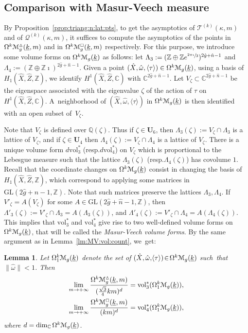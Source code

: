 \documentclass[11pt]{article}
\newcommand{\resp}{resp.\xspace}
\numberwithin{equation}{section}
\let\mathcal\EuScript
\theoremstyle{plain}
\newtheorem{Lemma}[Theorem]{Lemma}
\theoremstyle{definition}
\def\C{\mathbb{C}}
\newcommand\Z{\mathbb{Z}}
\newcommand{\Q}{\mathbb{Q}}
\newcommand{\Ub}{\mathbf{U}}
\newcommand{\Mcal}{\mathcal{M}}
\newcommand{\QQ}{\mathscr{Q}}
\newcommand{\TT}{\mathscr{T}}
\newcommand{\GL}{\mathrm{GL}}
\newcommand{\vol}{\mathrm{vol}}
\newcommand{\hg}{\hat{g}}
\newcommand{\hn}{\hat{n}}
\newcommand{\hX}{\hat{X}}
\newcommand{\hZ}{\hat{Z}}
\newcommand{\homg}{\hat{\omega}}
\let\ul\underline
\newcommand{\Skdiff}{\Omega^k\mathcal{M}_{g}(\ul{k})}
\newcommand{\Skdiffi}{\Omega^k_1\mathcal{M}_{g}(\ul{k})}
\newcommand{\Tkdiffm}{\Omega^k\Mcal^\vartriangle_g(\ul{k},m)}
\newcommand{\Qkdiffm}{\Omega^k\Mcal^{\scriptscriptstyle\square}_g(\ul{k},m)}
\begin{document}
\subsection{Comparison with Masur-Veech measure}\label{sec:compare:MV:vol}
By Proposition~\ref{prop:triang:n:lat:pts}, to get the asymptotics of $\TT^{(k)}(\kappa,m)$ and of $\QQ^{(k)}(\kappa,m)$, it suffices to compute the asymptotics of the points in $\Tkdiffm$ and in $\Qkdiffm$ respectively. For this purpose, we introduce some volume forms on $\Skdiff$ as follows: let $\Lambda_3:=(\Z\oplus\Z e^{\sfrac{2\pi\imath}{3}})^{2\hg+\hn-1}$ and $\Lambda_4:=(\Z\oplus\Z\imath)^{2\hg+\hn-1}$.
Given a point $(\hX,\homg,\langle\tau\rangle) \in \Skdiff$, using a basis of $H_1(\hX,\hZ,\Z)$, we identify $H^1(\hX,\hZ,\C)$ with $\C^{2\hg+\hn-1}$.
Let $V_\zeta \subset \C^{2\hg+\hn-1}$ be the eigenspace associated with the eigenvalue $\zeta$ of the action of $\tau$ on $H^1(\hX,\hZ,\C)$.
A~neighborhood of $(\hX,\homg,\langle\tau\rangle)$ in $\Skdiff$ is then identified with an open subset of~$V_\zeta$.

Note that $V_\zeta$ is defined over $\Q(\zeta)$. Thus if $\zeta \in \Ub_6$, then $\Lambda_3(\zeta):=V_\zeta\cap\Lambda_3$ is a lattice of $V_\zeta$, and if $\zeta\in \Ub_4$ then $\Lambda_4(\zeta):=V_\zeta\cap\Lambda_4$ is a lattice of $V_\zeta$.
There is a unique volume form $d\vol_3^*$ (\resp $d\vol_4^*$) on $V_\zeta$ which is proportional to the Lebesgue measure such that the lattice $\Lambda_3(\zeta)$ (\resp $\Lambda_4(\zeta)$) has covolume $1$.
Recall that the coordinate changes on $\Skdiff$ consist in changing the basis of $H_1(\hX,\hZ,\Z)$, which correspond to applying some matrices in $\GL(2\hg+\hn-1,\Z)$. Note that such matrices preserve the lattices $\Lambda_3,\Lambda_4$. If $V'_\zeta=A(V_\zeta)$ for some $A\in \GL(2\hg+\hn-1,\Z)$, then $\Lambda'_3(\zeta):=V'_\zeta\cap\Lambda_3=A(\Lambda_3(\zeta))$, and $\Lambda'_4(\zeta):=V'_\zeta\cap\Lambda_4=A(\Lambda_4(\zeta))$.
This implies that $\vol_3^*$ and $\vol_4^*$ give rise to two well-defined volume forms on $\Skdiff$, that will be called the \emph{Masur-Veech volume forms}. By the same argument as in Lemma~\ref{lm:MV:vol:count}, we~get:
\begin{Lemma}\label{lm:MV:asymp:triang} Let $\Skdiffi$ denote the set of $(\hX,\homg,\!\langle\tau\rangle)\!\in\!\Skdiff$ such~that~\hbox{$\|\homg\| \!<\!1$}. Then
\begin{align}
\label{eqn:asymp:n:vol:tria} \lim_{m\to +\infty}\frac{\Tkdiffm}{(\frac{\sqrt{3}}{4}km)^d} & = \vol_3^*(\Skdiffi), \\
\label{eq:asymp:n:vol:quad} \lim_{m\to +\infty}\frac{\Qkdiffm}{(km)^d} & = \vol_4^*(\Skdiffi),
\end{align}
where $d=\dim_\C\Skdiff$.
\end{Lemma}
\end{document}
